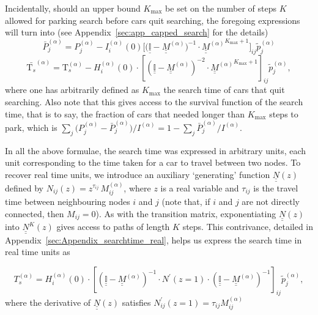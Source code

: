 \documentclass[trsc,reprint]{informs3}
\newcommand{\uul}[1]{\underline{\underline{#1}}}
\newcommand{\alp}{^{(\alpha)}}
\newcommand{\Ma}{ {\uul{M}\alp}}
\newcommand{\Tk}{\mathrm{T}_s}
\begin{document}
Incidentally, should an upper bound $K_{\max}$ be set on the number of steps $K$ allowed for parking search before cars quit searching, the foregoing expressions will turn into (see Appendix~\ref{sec:app_capped_search} for the details)
\begin{equation}
   \bar{P}\alp_{j}= P\alp_j - I_i\alp(0)  \Big[\Big(\uul{\mathbb{I}} - \Ma\Big)^{-1} \cdot  \Ma^{K_{\max}+1} \Big]_{ij} \tilde{p}\alp_j
   \label{eq:P_j_alp_capped}
\end{equation}
\begin{equation}
\bar{\Tk}^{(\alpha)} = \Tk^{(\alpha)} - H_i\alp(0)\cdot\left[(\uul{\mathbb{I}}-\Ma)^{-2}\cdot \Ma^{K_{\max}+1}\right]_{ij} \tilde{p}\alp_j,
\end{equation}
where one has arbitrarily defined as  $K_{\max}$ the search time of cars that quit searching. Also note that this gives access to the survival function of the search time, that is to say, the fraction of cars that needed longer than $K_{\max}$ steps to park, which is $\sum_j \Big( P\alp_j - \bar{P}\alp_{j} \Big)/I\alp= 1-\sum_j \bar{P}\alp_{j}/I\alp$.


In all the above formulae, the search time was expressed in arbitrary units, each unit corresponding to the time taken
for a car to travel between two nodes. To recover real time units, we introduce an auxiliary `generating' function
$\uul{N}(z)$ defined by $N_{ij}(z)=z^{\tau_{ij}}\,M_{ij}\alp$, where $z$ is a real variable and $\tau_{ij}$ is the travel time between neighbouring nodes $i$ and $j$ (note that, if $i$ and $j$ are not directly connected, then $M_{ij}=0$). As with the transition matrix, exponentiating $\uul{N}(z)$ into $\uul{N}^K(z)$ gives access to paths of length $K$ steps. This contrivance, detailed in Appendix~\ref{sec:Appendix_searchtime_real}, helps us express the search time in real time units as

\begin{equation}
T_{s}\alp =  H_i\alp(0) \cdot 
\left[(\uul{\mathbb{I}}-\Ma)^{-1}
\cdot N^\prime(z=1)
\cdot (\uul{\mathbb{I}}-\Ma)^{-1}
\right]_{ij}
\tilde{p}\alp_j,
\label{eq:stime_alpha_real}
\end{equation}
where the derivative of $\uul{N}(z)$ satisfies $N_{ij}^\prime(z=1)= \tau_{ij} M\alp_{ij}$
\end{document}

